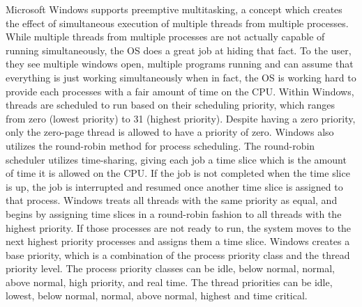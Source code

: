 \documentclass[letterpaper,10pt,draftclsnofoot,onecolumn,titlepage]{IEEEtran}
\begin{document}
		Microsoft Windows supports preemptive multitasking, a concept which creates the effect of simultaneous execution of multiple threads from multiple processes. While multiple threads from multiple processes are not actually capable of running simultaneously, the OS does a great job at hiding that fact. To the user, they see multiple windows open, multiple programs running and can assume that everything is just working simultaneously when in fact, the OS is working hard to provide each processes with a fair amount of time on the CPU. Within Windows, threads are scheduled to run based on their scheduling priority, which ranges from zero (lowest priority) to 31 (highest priority). \cite[About Processes and Threads]{Windows} Despite having a zero priority, only the zero-page thread is allowed to have a priority of zero. Windows also utilizes the round-robin method for process scheduling. The round-robin scheduler utilizes time-sharing, giving each job a time slice which is the amount of time it is allowed on the CPU. If the job is not completed when the time slice is up, the job is interrupted and resumed once another time slice is assigned to that process. Windows treats all threads with the same priority as equal, and begins by assigning time slices in a round-robin fashion to all threads with the highest priority. If those processes are not ready to run, the system moves to the next highest priority processes and assigns them a time slice. Windows creates a base priority, which is a combination of the process priority class and the thread priority level. The process priority classes can be idle, below normal, normal, above normal, high priority, and real time. The thread priorities can be idle, lowest, below normal, normal, above normal, highest and time critical.
		\par
\end{document}
